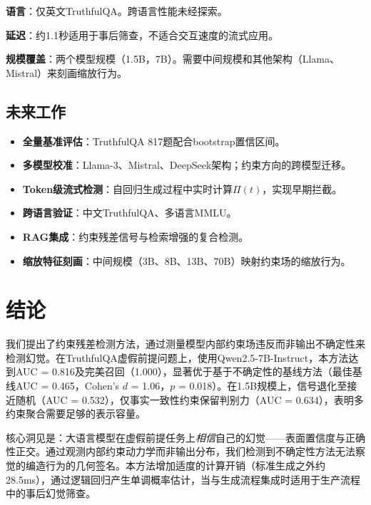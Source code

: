 \documentclass[11pt]{ctexart}
\begin{document}
\textbf{语言}：仅英文TruthfulQA。跨语言性能未经探索。

\textbf{延迟}：约1.1秒适用于事后筛查，不适合交互速度的流式应用。

\textbf{规模覆盖}：两个模型规模（1.5B，7B）。需要中间规模和其他架构（Llama、Mistral）来刻画缩放行为。

\subsection{未来工作}

\begin{itemize}
  \item \textbf{全量基准评估}：TruthfulQA 817题配合bootstrap置信区间。
  \item \textbf{多模型校准}：Llama-3、Mistral、DeepSeek架构；约束方向的跨模型迁移。
  \item \textbf{Token级流式检测}：自回归生成过程中实时计算$\Pi(t)$，实现早期拦截。
  \item \textbf{跨语言验证}：中文TruthfulQA、多语言MMLU。
  \item \textbf{RAG集成}：约束残差信号与检索增强的复合检测。
  \item \textbf{缩放特征刻画}：中间规模（3B、8B、13B、70B）映射约束场的缩放行为。
\end{itemize}

\section{结论}

我们提出了约束残差检测方法，通过测量模型内部约束场违反而非输出不确定性来检测幻觉。在TruthfulQA虚假前提问题上，使用Qwen2.5-7B-Instruct，本方法达到AUC = 0.816及完美召回（1.000），显著优于基于不确定性的基线方法（最佳基线AUC = 0.465，Cohen's $d$ = 1.06，$p$ = 0.018）。在1.5B规模上，信号退化至接近随机（AUC = 0.532），仅事实一致性约束保留判别力（AUC = 0.634），表明多约束聚合需要足够的表示容量。

核心洞见是：大语言模型在虚假前提任务上\textit{相信}自己的幻觉——表面置信度与正确性正交。通过观测内部约束动力学而非输出分布，我们检测到不确定性方法无法察觉的编造行为的几何签名。本方法增加适度的计算开销（标准生成之外约28.5ms），通过逻辑回归产生单调概率估计，当与生成流程集成时适用于生产流程中的事后幻觉筛查。
\end{document}
